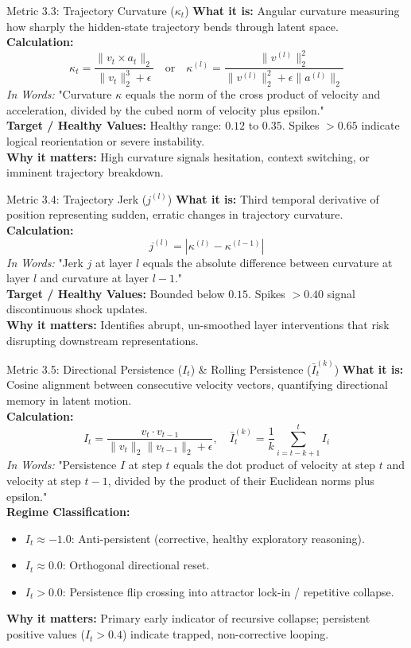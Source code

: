 \documentclass[10pt,a4paper]{article}
\begin{document}
\begin{metricbox}{Metric 3.3: Trajectory Curvature ($\kappa_t$)}
\textbf{What it is:} Angular curvature measuring how sharply the hidden-state trajectory bends through latent space.\\
\textbf{Calculation:}
$$\kappa_t = \frac{\|v_t \times a_t\|_2}{\|v_t\|_2^3 + \epsilon} \quad \text{or} \quad \kappa^{(l)} = \frac{\|v^{(l)}\|_2^2}{\|v^{(l)}\|_2^2 + \epsilon \|a^{(l)}\|_2}$$
\emph{In Words:} "Curvature $\kappa$ equals the norm of the cross product of velocity and acceleration, divided by the cubed norm of velocity plus epsilon."\\
\textbf{Target / Healthy Values:} Healthy range: $0.12$ to $0.35$. Spikes $> 0.65$ indicate logical reorientation or severe instability.\\
\textbf{Why it matters:} High curvature signals hesitation, context switching, or imminent trajectory breakdown.
\end{metricbox}

\begin{metricbox}{Metric 3.4: Trajectory Jerk ($j^{(l)}$)}
\textbf{What it is:} Third temporal derivative of position representing sudden, erratic changes in trajectory curvature.\\
\textbf{Calculation:}
$$j^{(l)} = \left|\kappa^{(l)} - \kappa^{(l-1)}\right|$$
\emph{In Words:} "Jerk $j$ at layer $l$ equals the absolute difference between curvature at layer $l$ and curvature at layer $l-1$."\\
\textbf{Target / Healthy Values:} Bounded below $0.15$. Spikes $> 0.40$ signal discontinuous shock updates.\\
\textbf{Why it matters:} Identifies abrupt, un-smoothed layer interventions that risk disrupting downstream representations.
\end{metricbox}

\begin{metricbox}{Metric 3.5: Directional Persistence ($I_t$) \& Rolling Persistence ($\bar{I}_t^{(k)}$)}
\textbf{What it is:} Cosine alignment between consecutive velocity vectors, quantifying directional memory in latent motion.\\
\textbf{Calculation:}
$$I_t = \frac{v_t \cdot v_{t-1}}{\|v_t\|_2 \|v_{t-1}\|_2 + \epsilon}, \quad \bar{I}_t^{(k)} = \frac{1}{k} \sum_{i=t-k+1}^t I_i$$
\emph{In Words:} "Persistence $I$ at step $t$ equals the dot product of velocity at step $t$ and velocity at step $t-1$, divided by the product of their Euclidean norms plus epsilon."\\
\textbf{Regime Classification:}
\begin{itemize}
    \item $I_t \approx -1.0$: Anti-persistent (corrective, healthy exploratory reasoning).
    \item $I_t \approx 0.0$: Orthogonal directional reset.
    \item $I_t > 0.0$: Persistence flip crossing into attractor lock-in / repetitive collapse.
\end{itemize}
\textbf{Why it matters:} Primary early indicator of recursive collapse; persistent positive values ($I_t > 0.4$) indicate trapped, non-corrective looping.
\end{metricbox}
\end{document}
